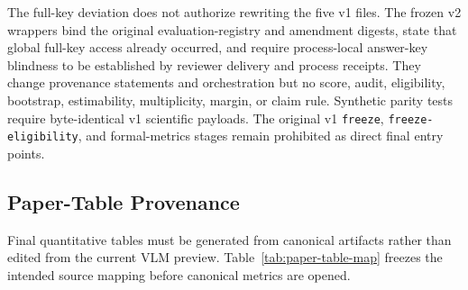 The full-key deviation does not authorize rewriting the five v1 files.  The
frozen v2 wrappers bind the original evaluation-registry and amendment
digests, state that global full-key access already occurred, and require
process-local answer-key blindness to be established by reviewer delivery and
process receipts.  They change provenance statements and orchestration but no
score, audit, eligibility, bootstrap, estimability, multiplicity, margin, or
claim rule.  Synthetic parity tests require byte-identical v1 scientific
payloads.  The original v1 \texttt{freeze}, \texttt{freeze-eligibility}, and
formal-metrics stages remain prohibited as direct final entry points.

\subsection{Paper-Table Provenance}
\label{app:table-provenance}

Final quantitative tables must be generated from canonical artifacts rather
than edited from the current VLM preview.  Table~\ref{tab:paper-table-map}
freezes the intended source mapping before canonical metrics are opened.

